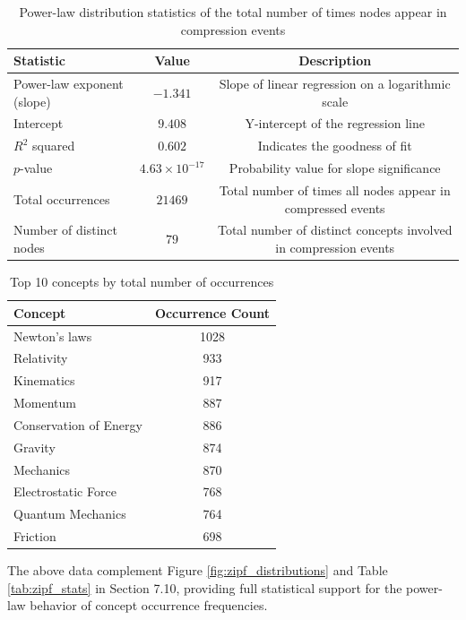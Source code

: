\documentclass[10pt,onecolumn]{article}
\begin{document}
\begin{table}[H]
\footnotesize
\centering
\caption{Power-law distribution statistics of the total number of times nodes appear in compression events}
\label{tab:app_zipf_total}
\begin{tabular}{lcc}
\toprule
\textbf{Statistic} & \textbf{Value} & \textbf{Description} \\
\midrule
Power-law exponent (slope) & $-1.341$ & Slope of linear regression on a logarithmic scale \\
Intercept & $9.408$ & Y-intercept of the regression line \\
$R^2$ squared & $0.602$ & Indicates the goodness of fit \\
$p$-value & $4.63\times10^{-17}$ & Probability value for slope significance \\
Total occurrences & $21469$ & Total number of times all nodes appear in compressed events \\
Number of distinct nodes & $79$ & Total number of distinct concepts involved in compression events \\
\bottomrule
\end{tabular}
\end{table}

\begin{table}[H]
\footnotesize
\centering
\caption{Top 10 concepts by total number of occurrences}
\label{tab:app_zipf_total_top10}
\begin{tabular}{lc}
\toprule
\textbf{Concept} & \textbf{Occurrence Count} \\
\midrule
Newton's laws & 1028 \\
Relativity & 933  \\
Kinematics & 917  \\
Momentum & 887  \\
Conservation of Energy & 886  \\
Gravity & 874  \\
Mechanics & 870  \\
Electrostatic Force & 768  \\
Quantum Mechanics & 764  \\
Friction & 698  \\
\bottomrule
\end{tabular}
\end{table}

The above data complement Figure \ref{fig:zipf_distributions} and Table \ref{tab:zipf_stats} in Section 7.10, providing full statistical support for the power-law behavior of concept occurrence frequencies.
\end{document}
